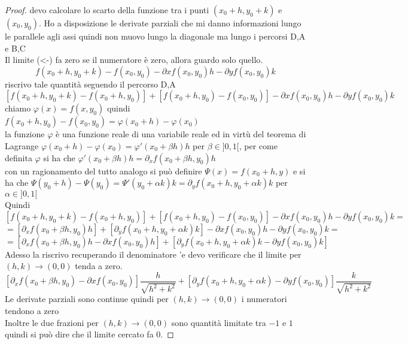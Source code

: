 \begin{proof}
	devo calcolare lo scarto della funzione tra i punti $(x_0+h,y_0+k)$ e $(x_0,y_0)$. Ho a disposizione le derivate parziali che mi danno informazioni lungo le parallele agli assi quindi non muovo lungo la diagonale ma lungo i percorsi D,A e B,C\\
	Il limite  (<-) fa zero se il numeratore è zero, allora guardo solo quello.\\
	$$f(x_0+h,y_0+k) -f(x_0,y_0)- \partial{x}f(x_0,y_0)h - \partial{y}f(x_0,y_0)k$$
	riscrivo tale quantità seguendo il percorso D,A
	$$ [f(x_0+h,y_0+k) - f(x_0+h,y_0)] + [f(x_0+h,y_0) - f(x_0,y_0)] - \partial{x}f(x_0,y_0)h - \partial{y}f(x_0,y_0)k$$
	chiamo $\varphi (x) = f(x,y_0)$ quindi $f(x_0+h,y_0)-f(x_0,y_0) = \varphi (x_0+h)-\varphi (x_0)$\\
	la funzione $\varphi $ è una funzione reale di una variabile reale ed in virtù del teorema di Lagrange $\varphi (x_0+h)-\varphi (x_0) = \varphi'(x_0 + \beta h)h$ per $\beta\in ]0,1[ $, per come definita $\varphi$ si ha che $\varphi'(x_0 + \beta h)h = \partial_{x}f(x_0+\beta h,y_0)h$\\
	con un ragionamento del tutto analogo si può definire $\varPsi (x) = f(x_0+h,y)$ e si ha che $\varPsi (y_0+h)-\varPsi (y_0) = \varPsi'(y_0 + \alpha k)k = \partial_{y}f(x_0+h,y_0+\alpha k)k$ per $\alpha\in ]0,1[ $\\
	Quindi
	$$ [f(x_0+h,y_0+k) - f(x_0+h,y_0)] + [f(x_0+h,y_0) - f(x_0,y_0)] - \partial{x}f(x_0,y_0)h - \partial{y}f(x_0,y_0)k = $$
	$$= [\partial_{x}f(x_0+\beta h,y_0)h] + [\partial_{y}f(x_0+h,y_0+\alpha k)k] - \partial{x}f(x_0,y_0)h - \partial{y}f(x_0,y_0)k = $$
	$$= [\partial_{x}f(x_0+\beta h,y_0)h - \partial{x}f(x_0,y_0)h] + [\partial_{y}f(x_0+h,y_0+\alpha k)k  - \partial{y}f(x_0,y_0)k] $$
	Adesso la riscrivo recuperando il denominatore 	'e devo verificare che il limite per $(h,k)\rightarrow (0,0)$ tenda a zero.\\
	
	$$[\partial_{x}f(x_0+\beta h,y_0)-\partial{x}f(x_0,y_0)] \frac{h}{\sqrt{h^2+k^2}} + [\partial_{y}f(x_0+h,y_0+\alpha k) - \partial{y}f(x_0,y_0)]\frac{k}{\sqrt{h^2+k^2}} $$
	Le derivate parziali sono continue quindi per $(h,k)\rightarrow (0,0)$ i numeratori tendono a zero\\
	Inoltre le due frazioni per $(h,k)\rightarrow (0,0)$ sono quantità limitate tra $-1$ e $1$ quindi si può dire che il limite cercato fa 0.
\end{proof}


